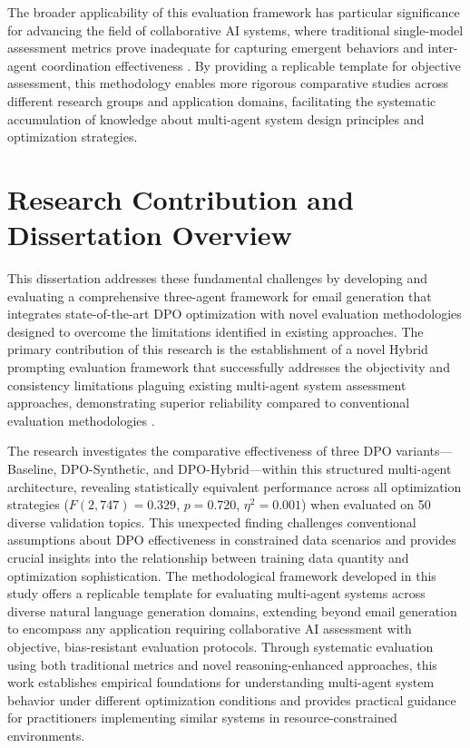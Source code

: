 The broader applicability of this evaluation framework has particular significance for advancing the field of collaborative AI systems, where traditional single-model assessment metrics prove inadequate for capturing emergent behaviors and inter-agent coordination effectiveness \cite{yehudai2025survey_llm_agents}. By providing a replicable template for objective assessment, this methodology enables more rigorous comparative studies across different research groups and application domains, facilitating the systematic accumulation of knowledge about multi-agent system design principles and optimization strategies.

\section{Research Contribution and Dissertation Overview}

This dissertation addresses these fundamental challenges by developing and evaluating a comprehensive three-agent framework for email generation that integrates state-of-the-art DPO optimization with novel evaluation methodologies designed to overcome the limitations identified in existing approaches. The primary contribution of this research is the establishment of a novel Hybrid prompting evaluation framework that successfully addresses the objectivity and consistency limitations plaguing existing multi-agent system assessment approaches, demonstrating superior reliability compared to conventional evaluation methodologies \cite{li2024generation_to_judgment, xu2025contextual_judge_bench}. 

The research investigates the comparative effectiveness of three DPO variants—Baseline, DPO-Synthetic, and DPO-Hybrid—within this structured multi-agent architecture, revealing statistically equivalent performance across all optimization strategies ($F(2,747) = 0.329$, $p = 0.720$, $\eta^2 = 0.001$) when evaluated on 50 diverse validation topics. This unexpected finding challenges conventional assumptions about DPO effectiveness in constrained data scenarios and provides crucial insights into the relationship between training data quantity and optimization sophistication. The methodological framework developed in this study offers a replicable template for evaluating multi-agent systems across diverse natural language generation domains, extending beyond email generation to encompass any application requiring collaborative AI assessment with objective, bias-resistant evaluation protocols. Through systematic evaluation using both traditional metrics and novel reasoning-enhanced approaches, this work establishes empirical foundations for understanding multi-agent system behavior under different optimization conditions and provides practical guidance for practitioners implementing similar systems in resource-constrained environments.

